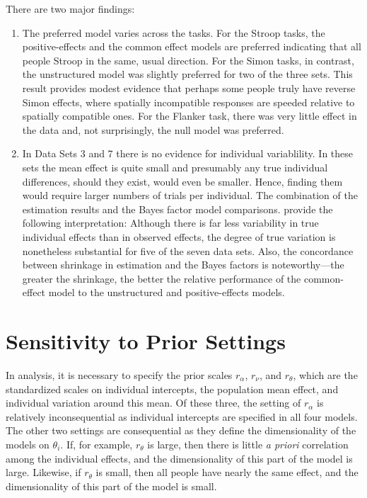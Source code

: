 \documentclass[american,man]{apa6}
\begin{document}
There are two major findings:

\begin{enumerate}
\def\labelenumi{\arabic{enumi}.}
\item
  The preferred model varies across the tasks. For the Stroop tasks, the
  positive-effects and the common effect models are preferred indicating
  that all people Stroop in the same, usual direction. For the Simon
  tasks, in contrast, the unstructured model was slightly preferred for
  two of the three sets. This result provides modest evidence that
  perhaps some people truly have reverse Simon effects, where spatially
  incompatible responses are speeded relative to spatially compatible
  ones. For the Flanker task, there was very little effect in the data
  and, not surprisingly, the null model was preferred.
\item
  In Data Sets 3 and 7 there is no evidence for individual variablility.
  In these sets the mean effect is quite small and presumably any true
  individual differences, should they exist, would even be smaller.
  Hence, finding them would require larger numbers of trials per
  individual. The combination of the estimation results and the Bayes
  factor model comparisons. provide the following interpretation:
  Although there is far less variability in true individual effects than
  in observed effects, the degree of true variation is nonetheless
  substantial for five of the seven data sets. Also, the concordance
  between shrinkage in estimation and the Bayes factors is
  noteworthy---the greater the shrinkage, the better the relative
  performance of the common-effect model to the unstructured and
  positive-effects models.
\end{enumerate}

\section{Sensitivity to Prior
Settings}\label{sensitivity-to-prior-settings}

In analysis, it is necessary to specify the prior scales \(r_\alpha\),
\(r_\nu\), and \(r_\theta\), which are the standardized scales on
individual intercepts, the population mean effect, and individual
variation around this mean. Of these three, the setting of \(r_\alpha\)
is relatively inconsequential as individual intercepts are specified in
all four models. The other two settings are consequential as they define
the dimensionality of the models on \(\theta_i\). If, for example,
\(r_\theta\) is large, then there is little \emph{a priori} correlation
among the individual effects, and the dimensionality of this part of the
model is large. Likewise, if \(r_\theta\) is small, then all people have
nearly the same effect, and the dimensionality of this part of the model
is small.
\end{document}
